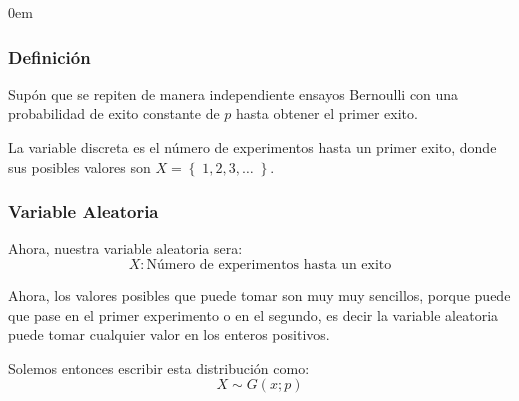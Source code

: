 \documentclass[12pt, fleqn]{report}                             %
\newenvironment{SmallIndentation}[1][0.75em]                    %
        {\begin{adjustwidth}{#1}{}\begin{footnotesize}}             %
        {\end{footnotesize}\end{adjustwidth}}                       %
\theoremstyle{break}                                            %
\newcommand{\Set}[1]{\left\{ \; #1 \; \right\}}                 %
\begin{document}
                \begin{multicols}{2}
                \begin{SmallIndentation}[0em]

                    \subsubsection{Definición}

                        Supón que se repiten de manera independiente ensayos Bernoulli
                        con una probabilidad de exito constante de $p$ hasta obtener el primer
                        exito.

                        La variable discreta es el número de experimentos hasta un primer exito,
                        donde sus posibles valores son $X = \Set{1, 2, 3, \dots}$.


                        \subsubsection{Variable Aleatoria}

                            Ahora, nuestra variable aleatoria sera:
                            \begin{equation*}
                                X : \text{Número de experimentos hasta un exito}
                            \end{equation*}

                            Ahora, los valores posibles que puede tomar son muy muy sencillos,
                            porque puede que pase en el primer experimento o en el segundo, 
                            es decir la variable aleatoria puede tomar cualquier valor en los enteros
                            positivos.

                            Solemos entonces escribir esta distribución como:
                            \begin{equation*}
                                X \sim G(x; p)
                            \end{equation*}


\end{SmallIndentation}
\end{multicols}
\end{document}
